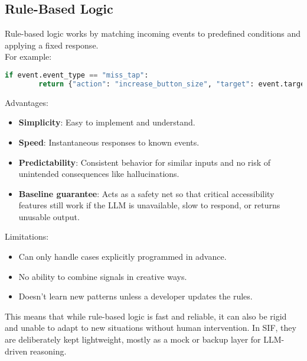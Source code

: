 \subsection{Rule-Based Logic}
Rule-based logic works by matching incoming events to predefined conditions and applying a fixed response.\\
For example:
\begin{lstlisting}[language=python, breaklines]
    if event.event_type == "miss_tap":
        return {"action": "increase_button_size", "target": event.target_element, "value": 1.5}
\end{lstlisting}
Advantages:
\begin{itemize}
    \item \textbf{Simplicity}: Easy to implement and understand.
    \item \textbf{Speed}: Instantaneous responses to known events.
    \item \textbf{Predictability}: Consistent behavior for similar inputs and no risk of unintended consequences like hallucinations.
    \item \textbf{Baseline guarantee}: Acts as a safety net so that critical accessibility features still work if the LLM is unavailable, slow to respond, or returns unusable output.
\end{itemize}
Limitations:
\begin{itemize}
    \item Can only handle cases explicitly programmed in advance.
    \item No ability to combine signals in creative ways.
    \item Doesn’t learn new patterns unless a developer updates the rules.
\end{itemize}
This means that while rule-based logic is fast and reliable, it can also be rigid and unable to adapt to new situations without human intervention. In SIF, they are deliberately kept lightweight, mostly as a mock or backup layer for LLM-driven reasoning.


